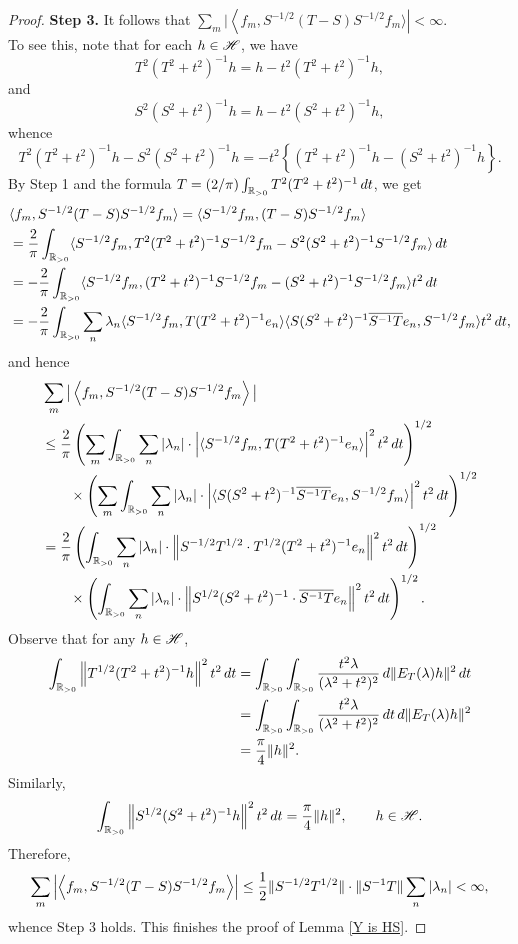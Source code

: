 \documentclass[12pt]{article}
\theoremstyle{plain}
\numberwithin{equation}{section}
\theoremstyle{remark}
\begin{document}
\begin{proof}
\textbf{Step 3.} It follows that $\sum_m|\left\langle f_m,S^{-1/2}(T-S)S^{-1/2}f_m\rangle\right|<\infty$.\\
To see this, note that for each $h\in\mathscr{H}$, we have
\[
T^2(T^2+t^2)^{-1}h = h-t^2(T^2+t^2)^{-1}h,
\]
and
\[
S^2(S^2+t^2)^{-1}h = h-t^2(S^2+t^2)^{-1}h,
\]
whence
\[
T^2(T^2+t^2)^{-1}h - S^2(S^2+t^2)^{-1}h = -t^2\left\{(T^2+t^2)^{-1}h-(S^2+t^2)^{-1}h\right\}.
\]
By Step 1 and the formula $T=(2/\pi)\int_{\mathbb{R}_{>0}}T^2(T^2+t^2)^{-1}\,dt$, we get
\begin{align*}
&\langle f_m,S^{-1/2}(T-S)S^{-1/2}f_m\rangle = \langle S^{-1/2}f_m,(T-S)S^{-1/2}f_m\rangle\\
&= \frac{2}{\pi}\int_{\mathbb{R}_{>0}}\langle S^{-1/2}f_m,T^2(T^2+t^2)^{-1}S^{-1/2}f_m-S^2(S^2+t^2)^{-1}S^{-1/2}f_m\rangle\,dt\\
&= -\frac{2}{\pi}\int_{\mathbb{R}_{>0}}\langle S^{-1/2}f_m,(T^2+t^2)^{-1}S^{-1/2}f_m-(S^2+t^2)^{-1}S^{-1/2}f_m\rangle t^2\,dt\\
&= -\frac{2}{\pi}\int_{\mathbb{R}_{>0}}\sum_n
\lambda_n\langle S^{-1/2}f_m,T(T^2+t^2)^{-1}e_n\rangle\langle S(S^2+t^2)^{-1}\overline{S^{-1}T}e_n,S^{-1/2}f_m\rangle t^2\,dt,
\end{align*}
and hence
\begin{align*}
&\sum_m \big| \left\langle f_m,S^{-1/2}(T-S)S^{-1/2}f_m\right\rangle \big|  \\
&\leq \frac{2}{\pi} \left( \sum_m\int_{\mathbb{R}_{>0}}\sum_n|\lambda_n|\cdot\left|\langle S^{-1/2}f_m,T(T^2+t^2)^{-1}e_n\rangle\right|^2t^2\,dt\right)^{1/2}\\
& \qquad 
\times\left(\sum_m\int_{\mathbb{R}_{>0}}\sum_n|\lambda_n|\cdot\left|\langle S(S^2+t^2)^{-1}\overline{S^{-1}T}e_n,S^{-1/2}f_m\rangle\right|^2t^2\,dt\right)^{1/2}\\
&= \frac{2}{\pi}\left(\int_{\mathbb{R}_{>0}}\sum_n|\lambda_n|\cdot\left\|S^{-1/2}T^{1/2}\cdot T^{1/2}(T^2+t^2)^{-1}e_n\right\|^2t^2\,dt\right)^{1/2}\\
& \qquad 
\times\left(\int_{\mathbb{R}_{>0}}\sum_n|\lambda_n|\cdot\left\|S^{1/2}(S^2+t^2)^{-1}\cdot\overline{S^{-1}T}e_n\right\|^2t^2\,dt\right)^{1/2}.
\end{align*}
Observe that for any $h\in\mathscr{H}$,
\begin{align*}
\int_{\mathbb{R}_{>0}} \left\|T^{1/2}(T^2+t^2)^{-1}h\right\|^2t^2\,dt
& = \int_{\mathbb{R}_{>0}}\int_{\mathbb{R}_{>0}}\frac{t^2\lambda}{(\lambda^2+t^2)^2}\,d\|E_T(\lambda)h\|^2\,dt \\
& = \int_{\mathbb{R}_{>0}}\int_{\mathbb{R}_{>0}}\frac{t^2\lambda}{(\lambda^2+t^2)^2}\,dt\,d\|E_T(\lambda)h\|^2 \\
& = \frac{\pi}{4}\|h\|^2.
\end{align*}
Similarly, 
\[
\int_{\mathbb{R}_{>0}}\left\|S^{1/2}(S^2+t^2)^{-1}h\right\|^2t^2\,dt =  \frac{\pi}{4}\|h\|^2, \qquad h\in\mathscr{H}.
\]
Therefore, 
\[
\sum_m\left| \left\langle f_m,S^{-1/2}(T-S)S^{-1/2}f_m\right\rangle \right| 
\leq \frac{1}{2} \| S^{-1/2}T^{1/2} \| \cdot\| S^{-1}T \| \sum_n |\lambda_n|
< \infty,
\]
whence Step 3 holds.
This finishes the proof of Lemma \ref{Y is HS}.
\end{proof}
\end{document}
